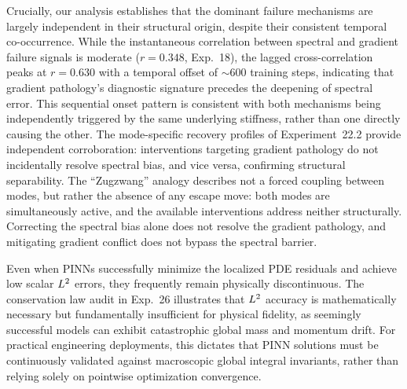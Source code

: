 Crucially, our analysis establishes that the dominant failure mechanisms are largely independent in their structural origin, despite their consistent temporal co-occurrence. While the instantaneous correlation between spectral and gradient failure signals is moderate ($r=0.348$, Exp.~18), the lagged cross-correlation peaks at $r=0.630$ with a temporal offset of $\sim 600$ training steps, indicating that gradient pathology's diagnostic signature precedes the deepening of spectral error. This sequential onset pattern is consistent with both mechanisms being independently triggered by the same underlying stiffness, rather than one directly causing the other. The mode-specific recovery profiles of Experiment~22.2 provide independent corroboration: interventions targeting gradient pathology do not incidentally resolve spectral bias, and vice versa, confirming structural separability. The ``Zugzwang'' analogy describes not a forced coupling between modes, but rather the absence of any escape move: both modes are simultaneously active, and the available interventions address neither structurally. Correcting the spectral bias alone does not resolve the gradient pathology, and mitigating gradient conflict does not bypass the spectral barrier.

Even when PINNs successfully minimize the localized PDE residuals and achieve low scalar $L^2$ errors, they frequently remain physically discontinuous. The conservation law audit in Exp.~26 illustrates that $L^2$ accuracy is mathematically necessary but fundamentally insufficient for physical fidelity, as seemingly successful models can exhibit catastrophic global mass and momentum drift. For practical engineering deployments, this dictates that PINN solutions must be continuously validated against macroscopic global integral invariants, rather than relying solely on pointwise optimization convergence.

